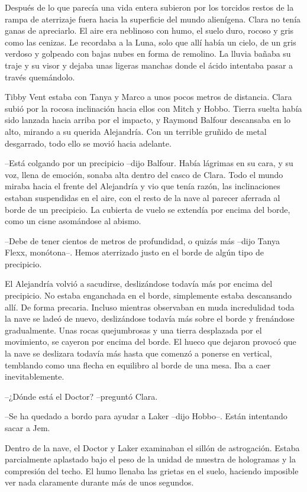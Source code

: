 {Después de lo que parecía una vida entera subieron por los torcidos
 restos de la rampa de aterrizaje fuera hacia la superficie del mundo
 alienígena. Clara no tenía ganas de apreciarlo. El aire era neblinoso
 con humo, el suelo duro, rocoso y gris como las cenizas. Le recordaba a
 la Luna, solo que allí había un cielo, de un gris verdoso y golpeado con
 bajas nubes en forma de remolino. La lluvia bañaba su traje y su visor y
 dejaba unas ligeras manchas donde el ácido intentaba pasar a través
quemándolo.}

{Tibby Vent estaba con Tanya y Marco a unos pocos metros de distancia.
 Clara subió por la rocosa inclinación hacia ellos con Mitch y Hobbo.
 Tierra suelta había sido lanzada hacia arriba por el impacto, y Raymond
 Balfour descansaba en lo alto, mirando a su querida Alejandría. Con un
 terrible gruñido de metal desgarrado, todo ello se movió hacia
adelante.}

{--Está colgando por un precipicio --dijo Balfour. Había lágrimas en su
 cara, y su voz, llena de emoción, sonaba alta dentro del casco de Clara.
 Todo el mundo miraba hacia el frente del Alejandría y vio que tenía
 razón, las inclinaciones estaban suspendidas en el aire, con el resto de
 la nave al parecer aferrada al borde de un precipicio. La cubierta de
 vuelo se extendía por encima del borde, como un cisne asomándose al
abismo.}

{--Debe de tener cientos de metros de profundidad, o quizás más --dijo
 Tanya Flexx, monótona--. Hemos aterrizado justo en el borde de algún
tipo de precipicio.}

{El Alejandría volvió a sacudirse, deslizándose todavía más por encima
 del precipicio. No estaba enganchada en el borde, simplemente estaba
 descansando allí. De forma precaria. Incluso mientras observaban en muda
 incredulidad toda la nave se ladeó de nuevo, deslizándose todavía más
 sobre el borde y frenándose gradualmente. Unas rocas quejumbrosas y una
 tierra desplazada por el movimiento, se cayeron por encima del borde. El
 hueco que dejaron provocó que la nave se deslizara todavía más hasta que
 comenzó a ponerse en vertical, temblando como una flecha en equilibro al
borde de una mesa. Iba a caer inevitablemente.}

{--¿Dónde está el Doctor? --preguntó Clara.}

{--Se ha quedado a bordo para ayudar a Laker --dijo Hobbo--. Están
intentando sacar a Jem.}

{Dentro de la nave, el Doctor y
 Laker examinaban el sillón de astrogación. Estaba parcialmente aplastado
 bajo el peso de la unidad de muestra de hologramas y la compresión del
 techo. El humo llenaba las grietas en el suelo, haciendo imposible ver
nada claramente durante más de unos segundos.}

